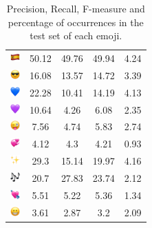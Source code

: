 \documentclass{article}
\begin{document}
\begin{table}
\begin{tabular}{|c|ccc|c|}
\includegraphics[height=0.37cm,width=0.37cm]{img/Spain.png} & 50.12 & 49.76 & 49.94 & 4.24\\ 
\includegraphics[height=0.37cm,width=0.37cm]{img/smiling_face_with_sunglasses.png} & 16.08 & 13.57 & 14.72 & 3.39\\ 
\includegraphics[height=0.37cm,width=0.37cm]{img/blue_heart.png} & 22.28 & 10.41 & 14.19 & 4.13\\ 
\includegraphics[height=0.37cm,width=0.37cm]{img/purple_heart.png} & 10.64 & 4.26 & 6.08 & 2.35\\ 
\includegraphics[height=0.37cm,width=0.37cm]{img/winking_face_with_tongue.png} & 7.56 & 4.74 & 5.83 & 2.74\\ 
\includegraphics[height=0.37cm,width=0.37cm]{img/revolving_hearts.png} & 4.12 & 4.3 & 4.21 & 0.93\\ 
\includegraphics[height=0.37cm,width=0.37cm]{img/sparkles.png} & 29.3 & 15.14 & 19.97 & 4.16\\ 
\includegraphics[height=0.37cm,width=0.37cm]{img/musical_notes.png} & 20.7 & 27.83 & 23.74 & 2.12\\ 
\includegraphics[height=0.37cm,width=0.37cm]{img/heart_with_arrow.png} & 5.51 & 5.22 & 5.36 & 1.34\\ 
\includegraphics[height=0.37cm,width=0.37cm]{img/beaming_face_with_smiling_eyes.png} & 3.61 & 2.87 & 3.2 & 2.09\\ 

\hline
\end{tabular}
\caption{\label{table:emoji_detailed} Precision, Recall, F-measure and percentage of occurrences in the test set of each emoji.}
\end{table}
\end{document}
